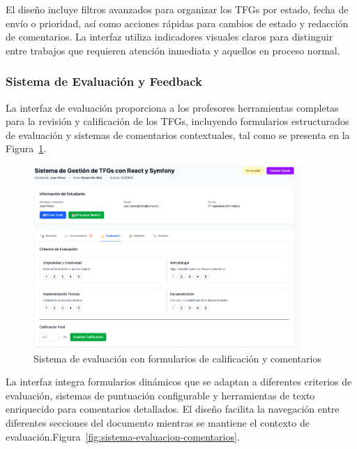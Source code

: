 \documentclass[12pt,a4paper,oneside]{report}
\begin{document}
El diseño incluye filtros avanzados para organizar los TFGs por estado, fecha de envío o prioridad, así como acciones rápidas para cambios de estado y redacción de comentarios. La interfaz utiliza indicadores visuales claros para distinguir entre trabajos que requieren atención inmediata y aquellos en proceso normal.

\subsubsection{Sistema de Evaluación y Feedback}\label{sistema-de-evaluacion-y-feedback}

La interfaz de evaluación proporciona a los profesores herramientas completas para la revisión y calificación de los TFGs, incluyendo formularios estructurados de evaluación y sistemas de comentarios contextuales, tal como se presenta en la Figura~\ref{fig:sistema-evaluacion}.

\begin{figure}[H]
\centering
\includegraphics[width=0.9\textwidth]{processed/images/sistema_evaluacion.png}
\caption{Sistema de evaluación con formularios de calificación y comentarios}
\label{fig:sistema-evaluacion}
\end{figure}

La interfaz integra formularios dinámicos que se adaptan a diferentes criterios de evaluación, sistemas de puntuación configurable y herramientas de texto enriquecido para comentarios detallados. El diseño facilita la navegación entre diferentes secciones del documento mientras se mantiene el contexto de evaluación.Figura~\ref{fig:sistema-evaluacion-comentarios}.
\end{document}
